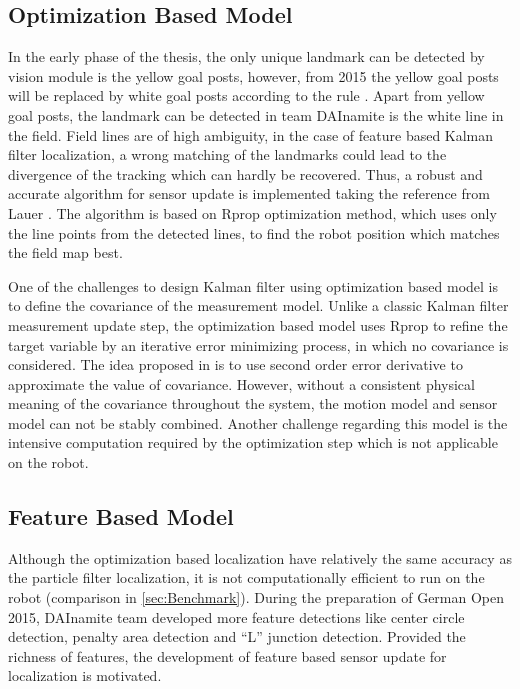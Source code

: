 \subsection{Optimization Based Model}\label{sec:optimization update} 
In the early phase of the thesis, the only unique landmark can be detected by vision module is the yellow goal posts, however, from 2015 the yellow goal posts will be replaced by white goal posts according to the rule \cite{Committee2013}. Apart from yellow goal posts, the landmark can be detected in team DAInamite is the white line in the field. Field lines are of high ambiguity, in the case of feature based Kalman filter localization, a wrong matching of the landmarks could lead to the divergence of the tracking which can hardly be recovered. Thus, a robust and accurate algorithm for sensor update is implemented taking the reference from Lauer \cite{Lauer2006}. The algorithm is based on Rprop \cite{Riedmiller1993} optimization method, which uses only the line points from the detected lines, to find the robot position which matches the field map best. 

One of the challenges to design Kalman filter using optimization based model is to define the covariance of the measurement model. Unlike a classic Kalman filter measurement update step, the optimization based model uses Rprop to refine the target variable by an iterative error minimizing process, in which no covariance is considered. The idea proposed in \cite{Lauer2006} is to use second order error derivative to approximate the value of covariance. However, without a consistent physical meaning of the covariance throughout the system, the motion model and sensor model can not be stably combined. Another challenge regarding this model is the intensive computation required by the optimization step which is not applicable on the robot. 



% 


\subsection{Feature Based Model}\label{sec:feature update} 
Although the optimization based localization have relatively the same accuracy as the particle filter localization, it is not computationally efficient to run on the robot (comparison in \autoref{sec:Benchmark}). During the preparation of German Open 2015, DAInamite team developed more feature detections like center circle detection, penalty area detection and ``L'' junction detection. Provided the richness of features, the development of feature based sensor update for localization is motivated.  

